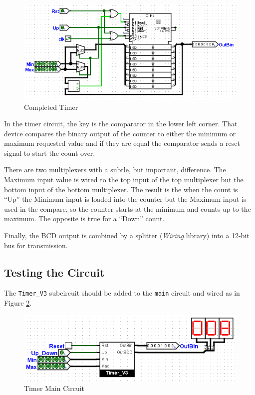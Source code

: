 \begin{figure}[H]
	\centering
	\includegraphics[width=\maxwidth{.95\linewidth}]{gfx/timer-01}
	\caption{Completed Timer}
	\label{fig:timer-01}
\end{figure}

In the timer circuit, the key is the comparator in the lower left corner. That device compares the binary output of the counter to either the minimum or maximum requested value and if they are equal the comparator sends a reset signal to start the count over. 

There are two multiplexers with a subtle, but important, difference. The Maximum input value is wired to the top input of the top multiplexer but the bottom input of the bottom multiplexer. The result is the when the count is ``Up'' the Minimum input is loaded into the counter but the Maximum input is used in the compare, so the counter starts at the minimum and counts up to the maximum. The opposite is true for a ``Down'' count.

Finally, the BCD output is combined by a splitter (\textit{Wiring} library) into a 12-bit bus for transmission.

\subsection{Testing the Circuit}

The \lstinline[columns=fixed]|Timer_V3| subcircuit should be added to the \lstinline[columns=fixed]|main| circuit and wired as in Figure \ref{fig:timer-02}.

\begin{figure}[H]
	\centering
	\includegraphics[width=\maxwidth{.95\linewidth}]{gfx/timer-02}
	\caption{Timer Main Circuit}
	\label{fig:timer-02}
\end{figure}
 
